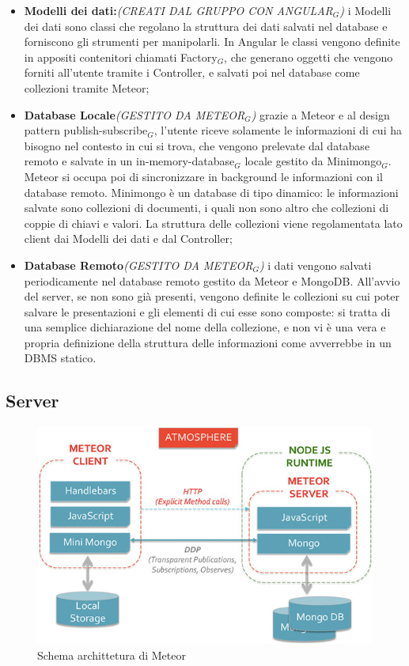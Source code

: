 \begin{itemize}
\item \textbf{Modelli dei dati:}\textit{(CREATI DAL GRUPPO CON ANGULAR$_G$)} i Modelli dei dati sono classi che regolano la struttura dei dati salvati nel database e forniscono gli strumenti per manipolarli. In Angular le classi vengono definite in appositi contenitori chiamati Factory$_G$, che generano oggetti che vengono forniti all'utente tramite i Controller, e salvati poi nel database come collezioni tramite Meteor;
\item \textbf{Database Locale}\textit{(GESTITO DA METEOR$_G$)} grazie a Meteor e al design pattern publish-subscribe$_G$, l'utente riceve solamente le informazioni di cui ha bisogno nel contesto in cui si trova, che vengono prelevate dal database remoto e salvate in un in-memory-database$_G$ locale gestito da Minimongo$_G$. Meteor si occupa poi di sincronizzare in background le informazioni con il database remoto. Minimongo è un database di tipo dinamico: le informazioni salvate sono collezioni di documenti, i quali non sono altro che collezioni di coppie di chiavi e valori. La struttura delle collezioni viene regolamentata lato client dai Modelli dei dati e dal Controller;
\item \textbf{Database Remoto}\textit{(GESTITO DA METEOR$_G$)} i dati vengono salvati periodicamente nel database remoto gestito da Meteor e MongoDB. All'avvio del server, se non sono già presenti, vengono definite le collezioni su cui poter salvare le presentazioni e gli elementi di cui esse sono composte: si tratta di una semplice dichiarazione del nome della collezione, e non vi è una vera e propria definizione della struttura delle informazioni come avverrebbe in un DBMS statico.
\end{itemize}



\subsection{Server}

\begin{figure}[H]
\begin{center}
\includegraphics[scale=0.70]{img/meteor_architettura.jpg}
\caption{Schema archittetura di Meteor}
\end{center}
\end{figure}

